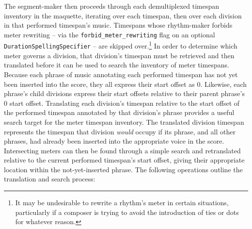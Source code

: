 The segment-maker then proceeds through each demultiplexed timespan inventory
in the maquette, iterating over each timespan, then over each division in that
performed timespan's music. Timespans whose rhythm-maker forbids meter
rewriting -- via the \texttt{forbid\_meter\_rewriting} flag on an optional
\texttt{DurationSpellingSpecifier} -- are skipped over.\footnote{It may be
undesirable to rewrite a rhythm's meter in certain situations, particularly if
a composer is trying to avoid the introduction of ties or dots for whatever
reason.} In order to determine which meter governs a division, that division's
timespan must be retrieved and then translated before it can be used to search
the inventory of meter timespans. Because each phrase of music annotating each
performed timespan has not yet been inserted into the score, they all express
their start offset as 0. Likewise, each phrase's child divisions express their
start offsets relative to their parent phrase's 0 start offset. Translating
each division's timespan relative to the start offset of the performed timespan
annotated by that division's phrase provides a useful search target for the
meter timespan inventory. The translated division timespan represents the
timespan that division \emph{would} occupy if its phrase, and all other
phrases, had already been inserted into the appropriate voice in the score.
Intersecting meters can then be found through a simple search and retranslated
relative to the current performed timespan's start offset, giving their
appropriate location within the not-yet-inserted phrase. The following
operations outline the translation and search process:

\begin{comment}
<abjad>
inscribed_timespan = consort.PerformedTimespan(
    start_offset=(5, 4),
    stop_offset=(9, 5),
    music=Container("{ c'4 }{ c'2 }{ c'4 }"),
    )
division = inscribed_timespan.music[1]
division_timespan = inspect_(division).get_timespan()
print(format(division_timespan))
translation = inscribed_timespan.start_offset
division_timespan = division_timespan.translate(translation)
print(format(division_timespan))
meter_timespan = meter_timespans.find_timespans_intersecting_timespan(
    division_timespan)[0]
print(format(meter_timespan))
translation = -1 * division_timespan.start_offset
meter_timespan = meter_timespan.translate(translation)
print(format(meter_timespan))
</abjad>
\end{comment}

